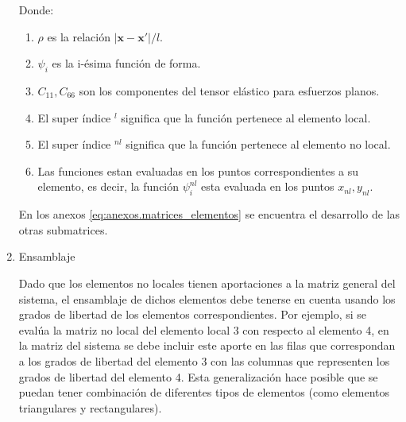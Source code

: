 \begin{enumerate}
				Donde:
				\begin{enumerate}
					\item[] $\rho$ es la relación $|\boldsymbol{x}-\boldsymbol{x'}|/l$.
					\item[] $\psi_i$ es la i-ésima función de forma.
					\item[] $C_{11},C_{66}$ son los componentes del tensor elástico para esfuerzos planos.
					\item[] El super índice $^l$ significa que la función pertenece al elemento local.
					\item[] El super índice $^{nl}$ significa que la función pertenece al elemento no local.
					\item[] Las funciones estan evaluadas en los puntos correspondientes a su elemento, es decir, la función $\psi_i^{nl}$ esta evaluada en los puntos $x_{nl},y_{nl}$.
				\end{enumerate}
				En los anexos \ref{eq:anexos.matrices_elementos} se encuentra el desarrollo de las otras submatrices.
				\item Ensamblaje

				Dado que los elementos no locales tienen aportaciones a la matriz general del sistema, el ensamblaje de dichos elementos debe tenerse en cuenta usando los grados de libertad de los elementos correspondientes. Por ejemplo, si se evalúa la matriz no local del elemento local 3 con respecto al elemento 4, en la matriz del sistema se debe incluir este aporte en las filas que correspondan a los grados de libertad del elemento 3 con las columnas que representen los grados de libertad del elemento 4. Esta generalización hace posible que se puedan tener combinación de diferentes tipos de elementos (como elementos triangulares y rectangulares).
			\end{enumerate}
